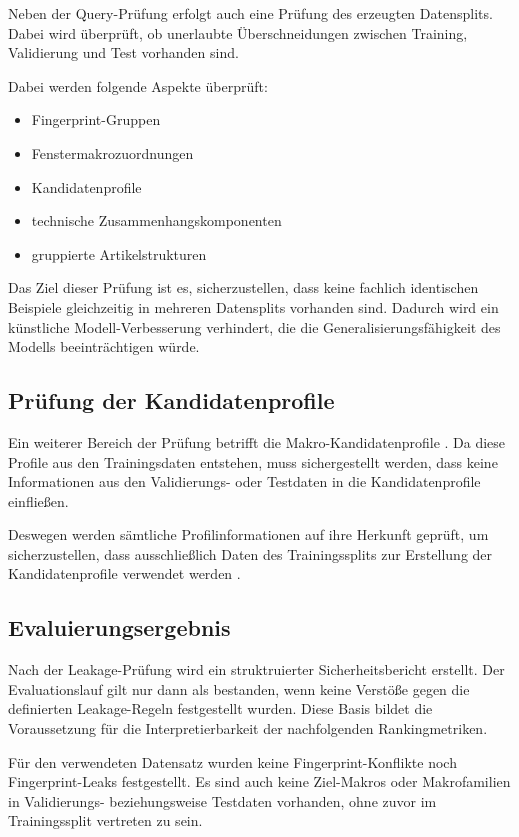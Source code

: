 Neben der Query-Prüfung erfolgt auch eine Prüfung des erzeugten Datensplits. Dabei wird überprüft, ob unerlaubte Überschneidungen zwischen Training, Validierung und Test vorhanden sind.

Dabei werden folgende Aspekte überprüft:

\begin{itemize} 
  \item Fingerprint-Gruppen 
  \item Fenstermakrozuordnungen \parencite{EPLAN-Makros} 
  \item Kandidatenprofile 
  \item technische Zusammenhangskomponenten 
  \item gruppierte Artikelstrukturen 
\end{itemize}

Das Ziel dieser Prüfung ist es, sicherzustellen, dass keine fachlich identischen Beispiele gleichzeitig in mehreren Datensplits vorhanden sind. Dadurch wird ein künstliche Modell-Verbesserung verhindert,
die die Generalisierungsfähigkeit des Modells beeinträchtigen würde.

\subsection{Prüfung der Kandidatenprofile}

Ein weiterer Bereich der Prüfung betrifft die Makro-Kandidatenprofile \parencite{EPLAN-Makros}.
Da diese Profile aus den Trainingsdaten entstehen, muss sichergestellt werden, dass keine Informationen aus den Validierungs- oder Testdaten in die Kandidatenprofile einfließen.

Deswegen werden sämtliche Profilinformationen auf ihre Herkunft geprüft, um sicherzustellen, dass ausschließlich Daten des Trainingssplits zur Erstellung der Kandidatenprofile verwendet werden \parencite{srcLeakageGuard}.

\subsection{Evaluierungsergebnis}

Nach der Leakage-Prüfung wird ein struktruierter Sicherheitsbericht erstellt. Der Evaluationslauf gilt nur dann als bestanden, wenn keine Verstöße gegen die definierten Leakage-Regeln festgestellt wurden.
Diese Basis bildet die Voraussetzung für die Interpretierbarkeit der nachfolgenden Rankingmetriken.

Für den verwendeten Datensatz wurden keine Fingerprint-Konflikte noch Fingerprint-Leaks festgestellt. 
Es sind auch keine Ziel-Makros \parencite{EPLAN-Makros} oder Makrofamilien in Validierungs- beziehungsweise Testdaten vorhanden, ohne zuvor im Trainingssplit vertreten zu sein. 

